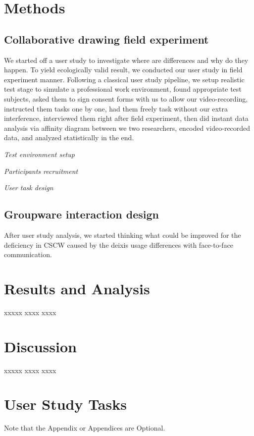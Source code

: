 \documentclass[12pt,twoside]{article}
\begin{document}
\section{Methods}
\label{sec:method}

\subsection{Collaborative drawing field experiment}
\label{sect:collaborative}
We started off a user study to investigate where are differences and why do they happen. To yield ecologically valid result, we conducted our user study in field experiment manner. Following a classical user study pipeline, we setup realistic test stage to simulate a professional work environment, found appropriate test subjects, asked them to sign consent forms with us to allow our video-recording, instructed them tasks one by one, had them freely task without our extra interference, interviewed them right after field experiment, then did instant data analysis via affinity diagram between we two researchers, encoded video-recorded data, and analyzed statistically in the end.

\textit{Test environment setup}

\textit{Participants recruitment}

\textit{User task design}

\textit{}

\subsection{Groupware interaction design}
\label{sect:groupware}
After user study analysis, we started thinking what could be improved for the deficiency in CSCW caused by the deixis usage differences with face-to-face communication.

\section{Results and Analysis}
\label{sec:results}

xxxxx xxxx xxxx 

\section{Discussion}
\label{sec:discussion}
xxxxx xxxx xxxx 



\appendix
\section{User Study Tasks}

Note that the Appendix or Appendices are Optional.
\end{document}
